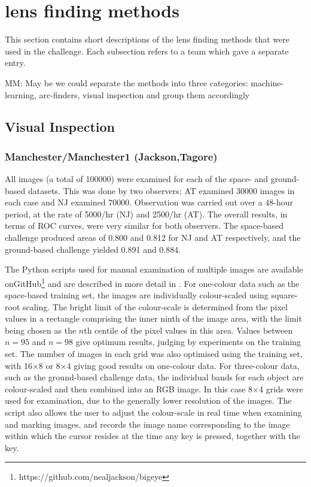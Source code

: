 \documentclass[useAMS,usenatbib]{mnras}
\begin{document}
\section{lens finding methods}
\label{sec:methods}

This section contains short descriptions of the lens finding methods that were used in 
the challenge.  Each subsection refers to a team which gave a separate entry.

{\color{red} MM: May be we could separate the methods into three categories: machine-learning, arc-finders, visual inspection and group them accordingly}

\subsection{Visual Inspection}
\subsubsection{Manchester/Manchester1 (Jackson,Tagore)}

All images (a total of 100000) were examined for each of the space- and
ground-based datasets. This was done by two observers; AT examined 30000
images in each case and NJ examined 70000. Observation was carried out
over a 48-hour period, at the rate of 5000/hr (NJ) and 2500/hr (AT). 
The overall results, in terms of ROC curves, were very similar for 
both observers. The space-based challenge produced areas of 0.800 and 
0.812 for NJ and AT respectively, and the ground-based challenge yielded 
0.891 and 0.884.

The Python scripts used for manual examination of multiple images are available
onGitHub\footnote{https://github.com/nealjackson/bigeye} and are described in more detail
in \citet{hartley2017support}. For one-colour data such as
the space-based training set, the images are individually colour-scaled using
square-root scaling. The bright limit of the colour-scale is determined
from the pixel values in a rectangle comprising the inner ninth of the
image area, with the limit being chosen as the $n$th centile of the pixel
values in this area. Values between $n=95$ and $n=98$ give optimum results,
judging by experiments on the training set. The number of images in each
grid was also optimised using the training set, with 16$\times$8 or 
8$\times$4 giving good results on one-colour data. For three-colour data,
such as the ground-based challenge data, the individual bands for each 
object are colour-scaled and then combined into an RGB image. In this case
8$\times$4 grids were used for examination, due to the generally lower 
resolution of the images. The script also allows the user to adjust the
colour-scale in real time when examining and marking images, and records
the image name corresponding to the image within which the cursor resides
at the time any key is pressed, together with the key.
\end{document}
